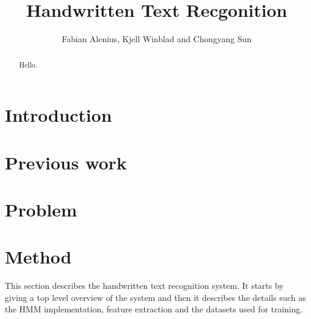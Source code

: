\documentclass[11pt]{article}
\author{Fabian Alenius, Kjell Winblad and Chongyang Sun} \title{Handwritten Text Recgonition}
\begin{document}
\maketitle

\begin{abstract}
Hello.

\end{abstract}

\section{Introduction}



\section{Previous work}

\section{Problem}

\section{Method}\label{sec:method}

This section describes the handwritten text recognition system. It starts by giving a top level overview of the system and then it describes the details such as the HMM implementation, feature extraction and the datasets used for training. 




\end{document}

